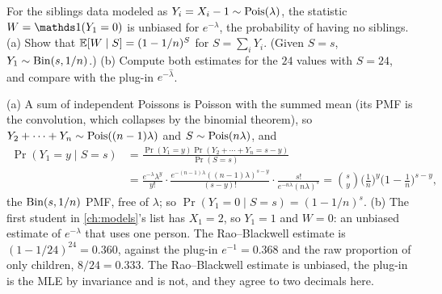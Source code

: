 \begin{exercise}
\label{ex:ef-rao-blackwell}
For the siblings data modeled as $Y_i = X_i - 1 \sim \text{Pois}(\lambda)$, the statistic $W = \ind(Y_1 = 0)$ is unbiased for $e^{-\lambda}$, the probability of having no siblings. (a) Show that $\operatorname*{\mathbb{E}}[W \mid S] = (1 - 1/n)^S$ for $S = \sum_i Y_i$. (Given $S = s$, $Y_1 \sim \mathrm{Bin}(s, 1/n)$.) (b) Compute both estimates for the $24$ values with $S = 24$, and compare with the plug-in $e^{-\hat{\lambda}}$.
\end{exercise}
\begin{solution}
(a) A sum of independent Poissons is Poisson with the summed mean (its PMF is the convolution, which collapses by the binomial theorem), so $Y_2 + \cdots + Y_n \sim \text{Pois}((n-1)\lambda)$ and $S \sim \text{Pois}(n\lambda)$, and
\begin{align*}
\Pr(Y_1 = y \mid S = s) &= \frac{\Pr(Y_1 = y)\Pr(Y_2 + \cdots + Y_n = s - y)}{\Pr(S = s)} \\
&= \frac{e^{-\lambda}\lambda^y}{y!}\cdot\frac{e^{-(n-1)\lambda}((n-1)\lambda)^{s-y}}{(s-y)!}\cdot\frac{s!}{e^{-n\lambda}(n\lambda)^s} = \binom{s}{y}\Big(\frac1n\Big)^y\Big(1 - \frac1n\Big)^{s-y},
\end{align*}
the $\mathrm{Bin}(s, 1/n)$ PMF, free of $\lambda$; so $\Pr(Y_1 = 0 \mid S = s) = (1 - 1/n)^s$. (b) The first student in \cref{ch:models}'s list has $X_1 = 2$, so $Y_1 = 1$ and $W = 0$: an unbiased estimate of $e^{-\lambda}$ that uses one person. The Rao--Blackwell estimate is $(1 - 1/24)^{24} = 0.360$, against the plug-in $e^{-1} = 0.368$ and the raw proportion of only children, $8/24 = 0.333$. The Rao--Blackwell estimate is unbiased, the plug-in is the MLE by invariance and is not, and they agree to two decimals here.
\end{solution}

